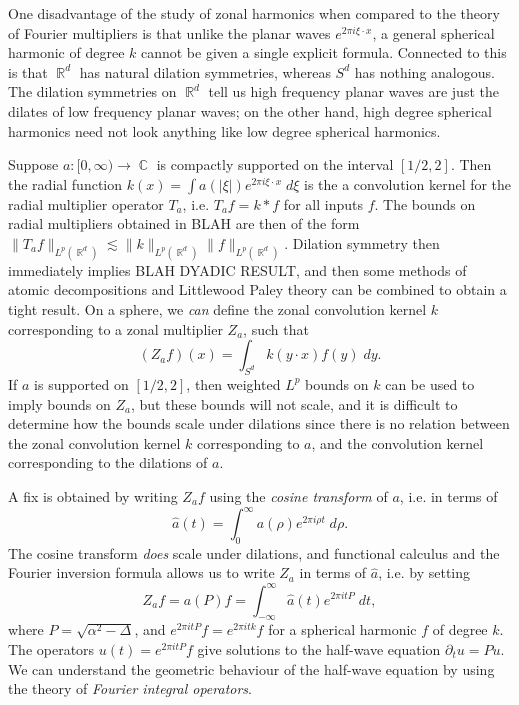 \documentclass[12pt]{article}
\DeclareMathOperator{\RR}{\mathbb{R}}
\DeclareMathOperator{\CC}{\mathbb{C}}
\begin{document}
\pagebreak[3]

One disadvantage of the study of zonal harmonics when compared to the theory of Fourier multipliers is that unlike the planar waves $e^{2 \pi i \xi \cdot x}$, a general spherical harmonic of degree $k$ cannot be given a single explicit formula. Connected to this is that $\RR^d$ has natural dilation symmetries, whereas $S^d$ has nothing analogous. The dilation symmetries on $\RR^d$ tell us high frequency planar waves are just the dilates of low frequency planar waves; on the other hand, high degree spherical harmonics need not look anything like low degree spherical harmonics.

Suppose $a: [0,\infty) \to \CC$ is compactly supported on the interval $[1/2,2]$. Then the radial function $k(x) = \int a(|\xi|) e^{2 \pi i \xi \cdot x}\; d\xi$ is the a convolution kernel for the radial multiplier operator $T_a$, i.e. $T_a f = k * f$ for all inputs $f$. The bounds on radial multipliers obtained in BLAH are then of the form $\| T_a f \|_{L^p(\RR^d)} \lesssim \| k \|_{L^p(\RR^d)} \| f \|_{L^p(\RR^d)}$. Dilation symmetry then immediately implies BLAH DYADIC RESULT, and then some methods of atomic decompositions and Littlewood Paley theory can be combined to obtain a tight result. On a sphere, we \emph{can} define the zonal convolution kernel $k$ corresponding to a zonal multiplier $Z_a$, such that
%
\[ (Z_a f)(x) = \int_{S^d} k( y \cdot x ) f(y)\; dy. \]
%
If $a$ is supported on $[1/2,2]$, then weighted $L^p$ bounds on $k$ can be used to imply bounds on $Z_a$, but these bounds will not scale, and it is difficult to determine how the bounds scale under dilations since there is no relation between the zonal convolution kernel $k$ corresponding to $a$, and the convolution kernel corresponding to the dilations of $a$.

A fix is obtained by writing $Z_a f$ using the \emph{cosine transform} of $a$, i.e. in terms of
%
\[ \widehat{a}(t) = \int_0^\infty a(\rho) e^{2 \pi i \rho t}\; d\rho. \]
%
The cosine transform \emph{does} scale under dilations, and functional calculus and the Fourier inversion formula allows us to write $Z_a$ in terms of $\widehat{a}$, i.e. by setting
%
\begin{equation} \label{InversionFormula}
	Z_a f = a(P) f = \int_{-\infty}^\infty \widehat{a}(t) e^{2 \pi i t P}\; dt,
\end{equation}
%
where $P = \sqrt{ \alpha^2 - \Delta }$, and $e^{2 \pi i t P} f = e^{2 \pi i t k} f$ for a spherical harmonic $f$ of degree $k$. The operators $u(t) = e^{2 \pi i t P} f$ give solutions to the half-wave equation $\partial_t u = P u$. We can understand the geometric behaviour of the half-wave equation by using the theory of \emph{Fourier integral operators}.
\end{document}
